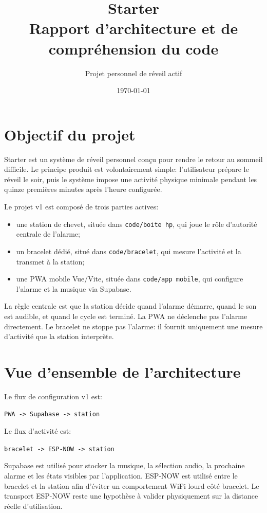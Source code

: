 \documentclass[11pt,a4paper]{article}
\title{\textbf{Starter}\\Rapport d'architecture et de compréhension du code}
\author{Projet personnel de réveil actif}
\date{\today}
\begin{document}
\maketitle
\tableofcontents
\newpage

\section{Objectif du projet}

Starter est un système de réveil personnel conçu pour rendre le retour au sommeil difficile. Le principe produit est volontairement simple: l'utilisateur prépare le réveil le soir, puis le système impose une activité physique minimale pendant les quinze premières minutes après l'heure configurée.

Le projet v1 est composé de trois parties actives:

\begin{itemize}
  \item une station de chevet, située dans \texttt{code/boite hp}, qui joue le rôle d'autorité centrale de l'alarme;
  \item un bracelet dédié, situé dans \texttt{code/bracelet}, qui mesure l'activité et la transmet à la station;
  \item une PWA mobile Vue/Vite, située dans \texttt{code/app mobile}, qui configure l'alarme et la musique via Supabase.
\end{itemize}

La règle centrale est que la station décide quand l'alarme démarre, quand le son est audible, et quand le cycle est terminé. La PWA ne déclenche pas l'alarme directement. Le bracelet ne stoppe pas l'alarme: il fournit uniquement une mesure d'activité que la station interprète.

\section{Vue d'ensemble de l'architecture}

Le flux de configuration v1 est:

\begin{center}
\texttt{PWA -> Supabase -> station}
\end{center}

Le flux d'activité est:

\begin{center}
\texttt{bracelet -> ESP-NOW -> station}
\end{center}

Supabase est utilisé pour stocker la musique, la sélection audio, la prochaine alarme et les états visibles par l'application. ESP-NOW est utilisé entre le bracelet et la station afin d'éviter un comportement WiFi lourd côté bracelet. Le transport ESP-NOW reste une hypothèse à valider physiquement sur la distance réelle d'utilisation.
\end{document}
